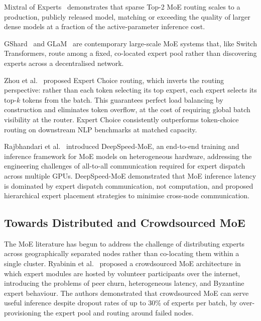 Mixtral of Experts~\cite{JiangMixtral2024} demonstrates that sparse Top-2 MoE routing scales to a production, publicly released model, matching or exceeding the quality of larger dense models at a fraction of the active-parameter inference cost.

GShard~\cite{LepikhinGShard2021} and GLaM~\cite{DuGLaM2022} are contemporary large-scale MoE systems that, like Switch Transformers, route among a fixed, co-located expert pool rather than discovering experts across a decentralised network.

Zhou et al.~\cite{Zhou2022} proposed Expert Choice routing, which inverts the routing perspective:
rather than each token selecting its top expert, each expert selects its top-$k$ tokens
from the batch. This guarantees perfect load balancing by construction and eliminates
token overflow, at the cost of requiring global batch visibility at the router.
Expert Choice consistently outperforms token-choice routing on downstream NLP benchmarks
at matched capacity.

Rajbhandari et al.~\cite{RajbhandariDeepSpeed2022} introduced DeepSpeed-MoE, an end-to-end training and
inference framework for MoE models on heterogeneous hardware, addressing the engineering
challenges of all-to-all communication required for expert dispatch across multiple GPUs.
DeepSpeed-MoE demonstrated that MoE inference latency is dominated by expert dispatch
communication, not computation, and proposed hierarchical expert placement strategies
to minimise cross-node communication.

\subsection{Towards Distributed and Crowdsourced MoE}
\label{sec:moe_routing:distributed}

The MoE literature has begun to address the challenge of distributing experts across
geographically separated nodes rather than co-locating them within a single cluster.
Ryabinin et al.~\cite{RyabininCrowdsourced2020} proposed a crowdsourced MoE architecture in which
expert modules are hosted by volunteer participants over the internet, introducing
the problems of peer churn, heterogeneous latency, and Byzantine expert behaviour.
The authors demonstrated that crowdsourced MoE can serve useful inference despite
dropout rates of up to 30\% of experts per batch, by over-provisioning the expert
pool and routing around failed nodes.


